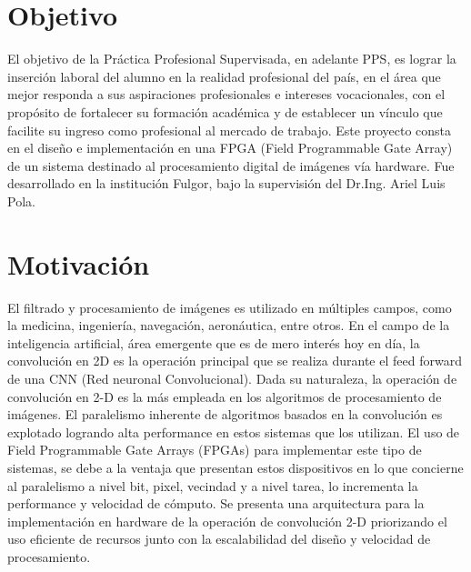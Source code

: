 % 
% 
%
\section*{\small Objetivo}\label{objetivo_sec}
{\renewcommand\baselinestretch{1}\small
El objetivo de la Práctica Profesional Supervisada, en adelante PPS, es lograr la inserción laboral del alumno en la realidad profesional del país, en el área que mejor responda a sus aspiraciones profesionales e intereses vocacionales, con el propósito de fortalecer su formación académica y de establecer un vínculo que facilite su ingreso como profesional al mercado de trabajo. 
Este proyecto consta en el diseño e implementación en una FPGA (Field Programmable Gate Array) de un sistema destinado al procesamiento digital de imágenes vía hardware. 
Fue desarrollado en la institución Fulgor, bajo la supervisión del Dr.Ing. Ariel
Luis Pola. \par}

\section*{\small Motivación}\label{motiv_sec}
{\renewcommand\baselinestretch{1}\small
El filtrado y procesamiento de imágenes es utilizado en múltiples campos, como la medicina, ingeniería, navegación, aeronáutica, entre otros. En el campo de la inteligencia artificial, área emergente que es de mero interés hoy en día, la convolución en 2D es la operación principal que se realiza durante el feed forward de una CNN (Red neuronal Convolucional). 
Dada su naturaleza, la operación de convolución en 2-D es la más empleada en los algoritmos de procesamiento de imágenes. El paralelismo inherente de algoritmos basados en la convolución es explotado logrando alta performance en estos sistemas que los utilizan.
El uso de Field Programmable Gate Arrays (FPGAs) para implementar este tipo de sistemas, se debe a la ventaja que presentan estos dispositivos en lo que concierne al paralelismo a nivel bit, pixel, vecindad y a nivel tarea, lo incrementa la performance y velocidad de cómputo.
Se presenta una arquitectura para la implementación en hardware de la operación
de convolución 2-D priorizando el uso eficiente de recursos junto con la
escalabilidad del diseño y velocidad de procesamiento. \par}